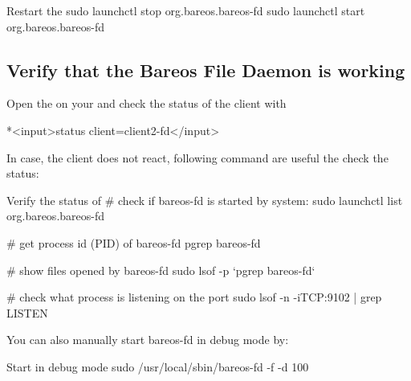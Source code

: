 \begin{commands}{Restart the \bareosFd}
sudo launchctl stop  org.bareos.bareos-fd
sudo launchctl start org.bareos.bareos-fd
\end{commands}

% 
% 

% 


\subsection{Verify that the Bareos File Daemon is working}

Open the  on your \bareosDir and check the status of the client with

\begin{bconfig}{}
*<input>status client=client2-fd</input>
\end{bconfig}

In case, the client does not react, following command are useful the check the status:


\begin{commands}{Verify the status of \bareosFd}
# check if bareos-fd is started by system:
sudo launchctl list org.bareos.bareos-fd

# get process id (PID) of bareos-fd
pgrep bareos-fd

# show files opened by bareos-fd
sudo lsof -p `pgrep bareos-fd`

# check what process is listening on the \bareosFd port
sudo lsof -n -iTCP:9102 | grep LISTEN
\end{commands}

You can also manually start bareos-fd in debug mode by:

\begin{commands}{Start \bareosFd in debug mode}
sudo /usr/local/sbin/bareos-fd -f -d 100
\end{commands}
